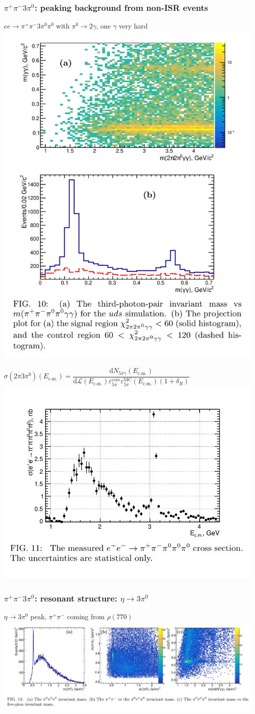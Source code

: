 \documentclass[10pt, aspectratio=169]{beamer}
\def\pip{\pi^+}
\def\pim{\pi^-}
\def\piz{\pi^0}
\begin{document}
\begin{frame}[label=3pi-bkg]%
  \frametitle{$\pip\pim3\piz$: peaking background from non-ISR events}
  \centering

  $ee\to\pip\pim3\piz\piz$ with $\piz\to2\gamma$, one $\gamma$ very hard
  \\[1ex]

  \includegraphics[width=.33\linewidth]{figures/003/fig010}
  \parbox[b]{.6\textwidth}{
    $ \sigma(2\pi3\piz)(E_\text{c.m.}) = \dfrac{\mathrm{d}
    N_{5\pi\gamma}(E_\text{c.m.})}
    {\mathrm{d}\mathcal{L}(E_\text{c.m.})
    \varepsilon^\text{corr}_{5\pi}
    \varepsilon^\text{MC}_{5\pi}(E_\text{c.m.})
    (1 + \delta_R)}$ \\
    \includegraphics[width=.5\textwidth]{figures/003/fig011}
  }
\end{frame}%

\begin{frame}[label=3pi-res-eta]%
  \frametitle{$\pip\pim3\piz$: resonant structure: $\eta\to3\piz$}
  \centering

  $\eta\to3\piz$ peak, $\pip\pim$ coming from $\rho(770)$ \\[1ex]

  \includegraphics[width=\linewidth]{figures/003/fig012}
\end{frame}%
\end{document}
